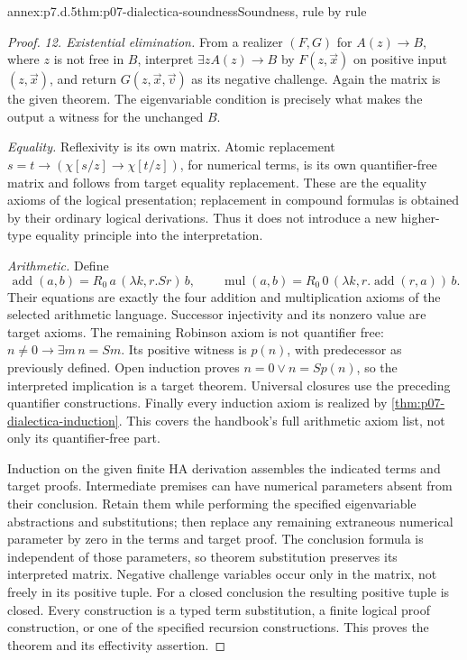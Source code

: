 \begin{annexitem}{annex:p7.d.5}{thm:p07-dialectica-soundness}{Soundness, rule by rule}
\begin{proof}
\emph{12. Existential elimination.} From a realizer \((F,G)\) for
\(A(z)\to B\), where \(z\) is not free in \(B\), interpret
\(\exists zA(z)\to B\) by
\(F(z,\vec x)\) on positive input \((z,\vec x)\), and return
\(G(z,\vec x,\vec v)\) as its negative challenge. Again the
matrix is the given theorem. The eigenvariable condition is precisely
what makes the output a witness for the unchanged \(B\).

\emph{Equality.} Reflexivity is its own matrix. Atomic replacement
\(s=t\to(\chi[s/z]\to\chi[t/z])\), for numerical terms, is
its own quantifier-free matrix and follows from target equality
replacement. These are the equality axioms of the logical presentation;
replacement in compound formulas is obtained by their ordinary logical
derivations. Thus it does not introduce a new higher-type equality
principle into the interpretation.

\emph{Arithmetic.} Define
\[
 \operatorname{add}(a,b)=R_0\,a\,(\lambda k,r.Sr)\,b,
 \qquad
 \operatorname{mul}(a,b)=R_0\,0\,
                  (\lambda k,r.\operatorname{add}(r,a))\,b.
\]
Their equations are exactly the four addition and multiplication axioms
of the selected arithmetic language. Successor injectivity and its
nonzero value are target axioms. The remaining Robinson axiom is not
quantifier free: \(n\ne0\to\exists m\,n=Sm\). Its positive
witness is \(p(n)\), with predecessor as previously defined. Open
induction proves \(n=0\lor n=Sp(n)\), so the interpreted implication
is a target theorem. Universal closures use the preceding quantifier
constructions. Finally every induction axiom is realized by
\cref{thm:p07-dialectica-induction}. This covers the handbook's full
arithmetic axiom list, not only its quantifier-free part.

Induction on the given finite HA derivation assembles the indicated
terms and target proofs. Intermediate premises can have numerical
parameters absent from their conclusion. Retain them while performing
the specified eigenvariable abstractions and substitutions; then replace
any remaining extraneous numerical parameter by zero in the terms and
target proof. The conclusion formula is independent of those parameters,
so theorem substitution preserves its interpreted matrix. Negative
challenge variables occur only in the matrix, not freely in its positive
tuple. For a closed conclusion the resulting positive tuple is closed. Every
construction is a typed term substitution, a finite logical proof
construction, or one of the specified recursion constructions. This
proves the theorem and its effectivity assertion.
\end{proof}
\end{annexitem}

